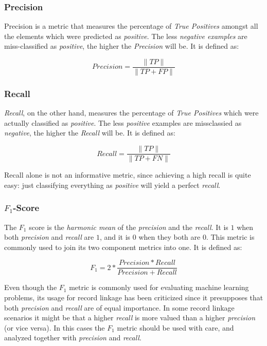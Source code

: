 \documentclass[epsfig,a4paper,11pt,titlepage,twoside,openany]{book}
\begin{document}
\subsubsection{Precision}
\label{sec:evaluation-metric-precision}

Precision is a metric that measures the percentage of \textit{True Positives}
amongst all the elements which were predicted as \textit{positive}. The less \textit{negative examples} are miss-classified as \textit{positive}, the higher the
\textit{Precision} will be. It is defined as:

$$
Precision = \frac{\|TP\|}{\|TP + FP\|}
$$
  


\subsubsection{Recall}
\label{sec:evaluation-metric-recall}

\textit{Recall}, on the other hand, measures the percentage of \textit{True
  Positives} which were actually classified as \textit{positive}. The less \textit{positive} examples are missclassied as \textit{negative}, the higher the
\textit{Recall} will be. It is defined as:

$$
Recall = \frac{\|TP\|}{\|TP + FN\|}
$$

Recall alone is not an informative metric, since achieving a high recall is
quite easy: just classifying everything as \textit{positive} will yield a
perfect \textit{recall}.



\subsubsection{$F_1$-Score}
\label{sec:evaluation-metric-f1}

The $F_1$ score is the \textit{harmonic mean} of the \textit{precision} and the
\textit{recall}. It is $1$ when both \textit{precision} and \textit{recall} are
$1$, and it is $0$ when they both are $0$. This metric is commonly used to join
its two component metrics into one. It is defined as:

$$
F_1 = 2 * \frac{Precision * Recall}{Precision + Recall}
$$

Even though the $F_1$ metric is commonly used for evaluating machine learning
problems, its usage for record linkage has been criticized
\cite{hand17_note_using_f_measur_evaluat} since it presupposes that both
\textit{precision} and \textit{recall} are of equal importance. In some record
linkage scenarios it might be that a higher \textit{recall} is more valued than a
higher \textit{precision} (or vice versa). In this cases the $F_1$ metric should
be used with care, and analyzed together with \textit{precision} and \textit{recall}.
\end{document}
